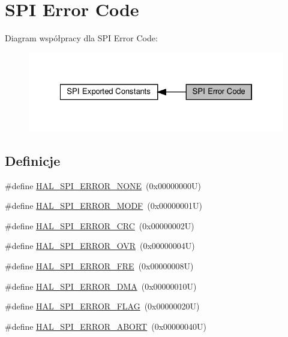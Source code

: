 \hypertarget{group___s_p_i___error___code}{}\section{S\+PI Error Code}
\label{group___s_p_i___error___code}
Diagram współpracy dla S\+PI Error Code\+:\nopagebreak
\begin{figure}[H]
\begin{center}
\leavevmode
\includegraphics[width=322pt]{group___s_p_i___error___code}
\end{center}
\end{figure}
\subsection*{Definicje}
\begin{DoxyCompactItemize}
\item 
\#define \hyperlink{group___s_p_i___error___code_gaac0006cdf5670741f8702e55d4bf4601}{H\+A\+L\+\_\+\+S\+P\+I\+\_\+\+E\+R\+R\+O\+R\+\_\+\+N\+O\+NE}~(0x00000000\+U)
\item 
\#define \hyperlink{group___s_p_i___error___code_ga75f5edd4e2a7a95bc9a994244df52460}{H\+A\+L\+\_\+\+S\+P\+I\+\_\+\+E\+R\+R\+O\+R\+\_\+\+M\+O\+DF}~(0x00000001\+U)
\item 
\#define \hyperlink{group___s_p_i___error___code_gad1163823ec5fa89e4670366565d4ab93}{H\+A\+L\+\_\+\+S\+P\+I\+\_\+\+E\+R\+R\+O\+R\+\_\+\+C\+RC}~(0x00000002\+U)
\item 
\#define \hyperlink{group___s_p_i___error___code_ga9587f998fed196a4f30c38f2da731c0f}{H\+A\+L\+\_\+\+S\+P\+I\+\_\+\+E\+R\+R\+O\+R\+\_\+\+O\+VR}~(0x00000004\+U)
\item 
\#define \hyperlink{group___s_p_i___error___code_gaf03238e57dd0c4d277fef2aa7a083133}{H\+A\+L\+\_\+\+S\+P\+I\+\_\+\+E\+R\+R\+O\+R\+\_\+\+F\+RE}~(0x00000008\+U)
\item 
\#define \hyperlink{group___s_p_i___error___code_gaaf91992131301e3fc7f2ce62fb011f6c}{H\+A\+L\+\_\+\+S\+P\+I\+\_\+\+E\+R\+R\+O\+R\+\_\+\+D\+MA}~(0x00000010\+U)
\item 
\#define \hyperlink{group___s_p_i___error___code_ga777b36b52caf926a384976baf34530a3}{H\+A\+L\+\_\+\+S\+P\+I\+\_\+\+E\+R\+R\+O\+R\+\_\+\+F\+L\+AG}~(0x00000020\+U)
\item 
\#define \hyperlink{group___s_p_i___error___code_gab7fa15838d5ef9316ed8a0ec1c782fb7}{H\+A\+L\+\_\+\+S\+P\+I\+\_\+\+E\+R\+R\+O\+R\+\_\+\+A\+B\+O\+RT}~(0x00000040\+U)
\end{DoxyCompactItemize}


